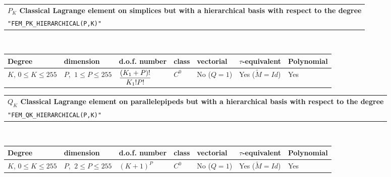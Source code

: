 \documentclass[11pt,a4paper]{article}
\begin{document}
\begin{center}
\begin{tabular}{|m{16.109cm}|} \hline 
{\bf $P_{K}$ Classical Lagrange element on simplices but with a hierarchical basis with respect to the degree}\\
{\tt "FEM\_PK\_HIERARCHICAL(P,K)"} 
\end{tabular} \\ \vspace{-1pt} 
\begin{tabular}{|m{2cm}|m{2cm}|m{2.5cm}|m{1.5cm}|m{1.5cm}|m{2cm}|m{2cm}|} \hline 
Degree & dimension & d.o.f. number & class & vectorial & \mbox{$\tau$-equivalent} & Polynomial\\ \hline
\small \mbox{$K$}, \small \mbox{$0 \leq K\leq 255$} & \small $P$, \mbox{$\ 1 \leq P \leq 255$} & \mbox{${\displaystyle \frac{\displaystyle (K_1+P)!}{\displaystyle K_1! P!}}$} & $C^0$ & No \mbox{($Q = 1$)} & Yes \mbox{($\tilde{M} = Id$)}  & Yes\\ \hline
\end{tabular}
\end{center}

\begin{center}
\begin{tabular}{|m{16.109cm}|} \hline 
{\bf $Q_{K}$ Classical Lagrange element on parallelepipeds but with a hierarchical basis with respect to the degree}\\
{\tt "FEM\_QK\_HIERARCHICAL(P,K)"} 
\end{tabular} \\ \vspace{-1pt} 
\begin{tabular}{|m{2cm}|m{2cm}|m{2.5cm}|m{1.5cm}|m{1.5cm}|m{2cm}|m{2cm}|} \hline 
Degree & dimension & d.o.f. number & class & vectorial & \mbox{$\tau$-equivalent} & Polynomial\\ \hline
\small \mbox{$K$}, \small \mbox{$0 \leq K\leq 255$} & \small $P$, \mbox{$\ 2 \leq P \leq 255$} & \mbox{$(K+1)^P$} & $C^0$ & No \mbox{($Q = 1$)} & Yes \mbox{($\tilde{M} = Id$)}  & Yes\\ \hline
\end{tabular}
\end{center}
\end{document}
